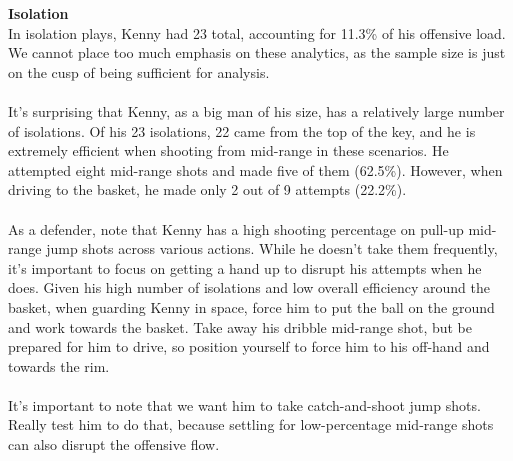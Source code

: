 \documentclass[a4paper,12pt]{article}
\begin{document}
\begin{multicols}{2}
    {\large \noindent \textbf{Isolation}} \\ 
    In isolation plays, Kenny had 23 total, accounting for 11.3\% of his offensive load. We cannot place too much emphasis on these analytics, as the sample size is just on the cusp of being sufficient for analysis. \\ \\
    It's surprising that Kenny, as a big man of his size, has a relatively large number of isolations. Of his 23 isolations, 22 came from the top of the key, and he is extremely efficient when shooting from mid-range in these scenarios. He attempted eight mid-range shots and made five of them (62.5\%). However, when driving to the basket, he made only 2 out of 9 attempts (22.2\%). \\ \\
    As a defender, note that Kenny has a high shooting percentage on pull-up mid-range jump shots across various actions. While he doesn't take them frequently, it's important to focus on getting a hand up to disrupt his attempts when he does. Given his high number of isolations and low overall efficiency around the basket, when guarding Kenny in space, force him to put the ball on the ground and work towards the basket. Take away his dribble mid-range shot, but be prepared for him to drive, so position yourself to force him to his off-hand and towards the rim.\\ \\
    It's important to note that we want him to take catch-and-shoot jump shots. Really test him to do that, because settling for low-percentage mid-range shots can also disrupt the offensive flow.\vspace{1em}


\end{multicols}
\end{document}

